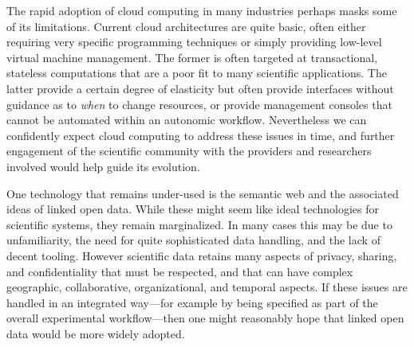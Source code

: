 

The rapid adoption of cloud computing in many industries perhaps masks
some of its limitations. Current cloud architectures are quite basic,
often either requiring very specific programming techniques or simply
providing low-level virtual machine management. The former is often
targeted at transactional, stateless computations that are a poor fit
to many scientific applications. The latter provide a certain degree
of elasticity but often provide interfaces without guidance as to
\emph{when} to change resources, or provide management consoles that
cannot be automated within an autonomic workflow. Nevertheless we can
confidently expect cloud computing to address these issues in time,
and further engagement of the scientific community with the providers
and researchers involved would help guide its
evolution.   


One technology that remains under-used  is the semantic
web and the associated ideas of linked open data. While these might
seem like ideal technologies for scientific systems, they remain
marginalized. In many cases this may be due to unfamiliarity, the need
for quite sophisticated data handling, and the lack of decent
tooling. However scientific data retains many aspects of privacy,
sharing, and confidentiality that must be respected, and that can have
complex geographic, collaborative, organizational, and temporal
aspects. If these issues are handled in an integrated way---for
example by being specified as part of the overall experimental
workflow---then one might reasonably hope that linked open data would
be more widely adopted. 

